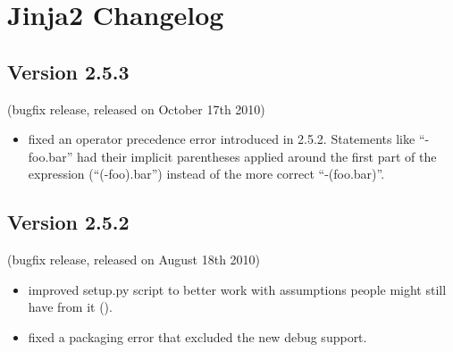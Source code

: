 \documentclass[a4paper,10pt,english]{sphinxmanual}
\begin{document}
\chapter{Jinja2 Changelog}
\label{changelog:jinja-1}\label{changelog::doc}\label{changelog:jinja2-changelog}

\section{Version 2.5.3}
\label{changelog:version-2-5-3}
(bugfix release, released on October 17th 2010)
\begin{itemize}
\item {} 
fixed an operator precedence error introduced in 2.5.2.  Statements
like ``-foo.bar'' had their implicit parentheses applied around the
first part of the expression (``(-foo).bar'') instead of the more
correct ``-(foo.bar)''.

\end{itemize}


\section{Version 2.5.2}
\label{changelog:version-2-5-2}
(bugfix release, released on August 18th 2010)
\begin{itemize}
\item {} 
improved setup.py script to better work with assumptions people
might still have from it ().

\item {} 
fixed a packaging error that excluded the new debug support.

\end{itemize}
\end{document}
